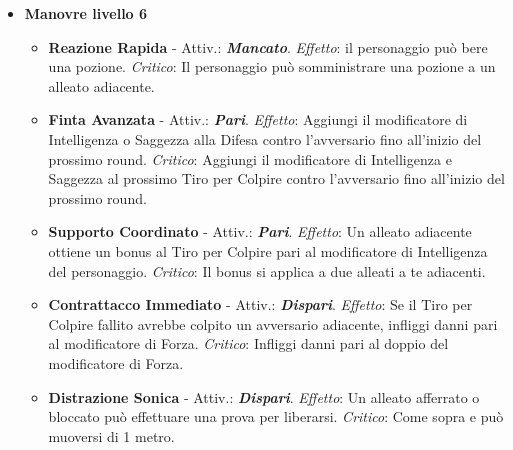 \begin{multicols}{2}
\begin{itemize}[leftmargin=*]
\begin{itemize}[leftmargin=*]
		\item \textbf{Intralcio Rapido} - Attiv.: \textbf{\emph{Mancato}} con un \textbf{\emph{dispari}}. \emph{Effetto}: L'avversario riduce di 1 metro il suo movimento nel prossimo round. \emph{Critico}: il prossimo movimento entro il prossimo round dell'avversario lo considera come terreno difficile.

		\item \textbf{Apertura Tattica} - Attiv.: \textbf{\emph{Mancato}} con un \textbf{\emph{pari}}. \emph{Effetto}: Un alleato ottiene +1 al prossimo Tiro per Colpire contro l'avversario. \emph{Critico}: L'alleato ottiene +2 al Tiro per Colpire.
	\end{itemize}

	\item \textbf{Manovre livello 6}
	\begin{itemize}[leftmargin=*]
		\setlength{\itemsep}{0pt}
		\item \textbf{Reazione Rapida} - Attiv.: \textbf{\emph{Mancato}}. \emph{Effetto}: il personaggio può bere una pozione. \emph{Critico}: Il personaggio può somministrare una pozione a un alleato adiacente.

		\item \textbf{Finta Avanzata} - Attiv.: \textbf{\emph{Pari}}. \emph{Effetto}: Aggiungi il modificatore di Intelligenza o Saggezza alla Difesa contro l'avversario fino all'inizio del prossimo round. \emph{Critico}: Aggiungi il modificatore di Intelligenza e Saggezza al prossimo Tiro per Colpire contro l'avversario fino all'inizio del prossimo round.

		\item \textbf{Supporto Coordinato} - Attiv.: \textbf{\emph{Pari}}. \emph{Effetto}: Un alleato adiacente ottiene un bonus al Tiro per Colpire pari al modificatore di Intelligenza del personaggio. \emph{Critico}: Il bonus si applica a due alleati a te adiacenti.

		\item \textbf{Contrattacco Immediato} - Attiv.: \textbf{\emph{Dispari}}. \emph{Effetto}: Se il Tiro per Colpire fallito avrebbe colpito un avversario adiacente, infliggi danni pari al modificatore di Forza. \emph{Critico}: Infliggi danni pari al doppio del modificatore di Forza.

		\item \textbf{Distrazione Sonica} - Attiv.: \textbf{\emph{Dispari}}. \emph{Effetto}: Un alleato afferrato o bloccato può effettuare una prova per liberarsi. \emph{Critico}: Come sopra e può muoversi di 1 metro.
	\end{itemize}


\end{itemize}
\end{multicols}
